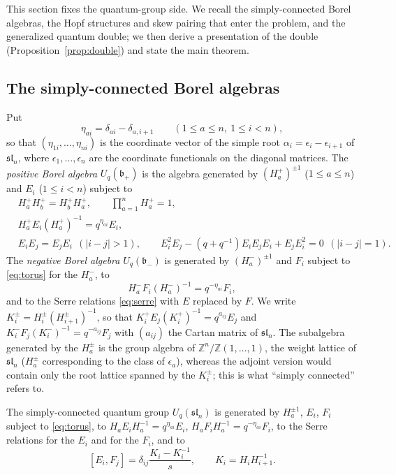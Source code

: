 \documentclass[11pt]{article}
\theoremstyle{remark}
\newcommand{\U}{U_q}
\newcommand{\slN}{\mathfrak{sl}_n}
\newcommand{\bp}{\mathfrak b_+}
\newcommand{\bm}{\mathfrak b_-}
\begin{document}
This section fixes the quantum-group side. We recall the
simply-connected Borel algebras, the Hopf structures and skew pairing
that enter the problem, and the generalized quantum double; we then
derive a presentation of the double (Proposition~\ref{prop:double}) and
state the main theorem.

\subsection{The simply-connected Borel algebras}

Put
\[
 \eta_{ai}=\delta_{ai}-\delta_{a,i+1}
 \qquad(1\le a\le n,\ 1\le i<n),
\]
so that $(\eta_{1i},\dots,\eta_{ni})$ is the coordinate vector of the
simple root $\alpha_i=\epsilon_i-\epsilon_{i+1}$ of $\slN$, where
$\epsilon_1,\dots,\epsilon_n$ are the coordinate functionals on the
diagonal matrices. The
\emph{positive Borel algebra} $\U(\bp)$ is the algebra generated by
$(H^+_a)^{\pm1}$ ($1\le a\le n$) and $E_i$ ($1\le i<n$) subject to
\begin{align}
 &H^+_aH^+_b=H^+_bH^+_a,\qquad \textstyle\prod_{a=1}^nH^+_a=1,
 \label{eq:torus}\\
 &H^+_aE_i(H^+_a)^{-1}=q^{\eta_{ai}}E_i, \label{eq:chevalley}\\
 &E_iE_j=E_jE_i\ \ (|i-j|>1),\qquad
 E_i^2E_j-(q+q^{-1})E_iE_jE_i+E_jE_i^2=0\ \ (|i-j|=1).
 \label{eq:serre}
\end{align}
The \emph{negative Borel algebra} $\U(\bm)$ is generated by
$(H^-_a)^{\pm1}$ and $F_i$ subject to \eqref{eq:torus} for the $H^-_a$,
to
\begin{equation}\label{eq:chevalleyminus}
 H^-_aF_i(H^-_a)^{-1}=q^{-\eta_{ai}}F_i,
\end{equation}
and to the Serre relations \eqref{eq:serre} with $E$ replaced by $F$.
We write $K^\pm_i=H^\pm_i(H^\pm_{i+1})^{-1}$, so that
$K^+_iE_j(K^+_i)^{-1}=q^{a_{ij}}E_j$ and
$K^-_iF_j(K^-_i)^{-1}=q^{-a_{ij}}F_j$ with $(a_{ij})$ the Cartan matrix
of $\slN$. The subalgebra
generated by the $H^\pm_a$ is the group algebra of
$\mathbb Z^n/\mathbb Z(1,\dots,1)$, the weight lattice of $\slN$
($H^\pm_a$ corresponding to the class of $\epsilon_a$), whereas the
adjoint version would contain only the root lattice spanned by the
$K^\pm_i$; this is what ``simply connected'' refers to.

The simply-connected quantum group $\U(\slN)$ is generated by
$H_a^{\pm1}$, $E_i$, $F_i$ subject to \eqref{eq:torus}, to
$H_aE_iH_a^{-1}=q^{\eta_{ai}}E_i$, $H_aF_iH_a^{-1}=q^{-\eta_{ai}}F_i$,
to the Serre relations for the $E_i$ and for the $F_i$, and to
\begin{equation}\label{eq:EFsl}
 [E_i,F_j]=\delta_{ij}\frac{K_i-K_i^{-1}}{s},\qquad K_i=H_iH_{i+1}^{-1}.
\end{equation}
\end{document}
